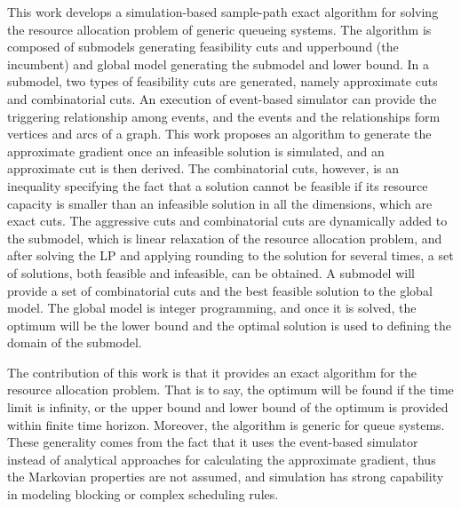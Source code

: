 \documentclass[]{interact}
\begin{document}
This work develops a simulation-based sample-path exact algorithm for solving the resource allocation problem of generic queueing systems. The algorithm is composed of submodels generating feasibility cuts and upperbound (the incumbent) and global model generating the submodel and lower bound. In a submodel, two types of feasibility cuts are generated, namely approximate cuts and combinatorial cuts. An execution of event-based simulator can provide the triggering relationship among events, and the events and the relationships form vertices and arcs of a graph. This work proposes an algorithm to generate the approximate gradient once an infeasible solution is simulated, and an approximate cut is then derived. The combinatorial cuts, however, is an inequality specifying the fact that a solution cannot be feasible if its resource capacity is smaller than an infeasible solution in all the dimensions, which are exact cuts. The aggressive cuts and combinatorial cuts are dynamically added to the submodel, which is linear relaxation of the resource allocation problem, and after solving the LP and applying rounding to the solution for several times, a set of solutions, both feasible and infeasible, can be obtained. A submodel will provide a set of combinatorial cuts and the best feasible solution to the global model. The global model is integer programming, and once it is solved, the optimum will be the lower bound and the optimal solution is used to defining the domain of the submodel.

The contribution of this work is that it provides an exact algorithm for the resource allocation problem. That is to say, the optimum will be found if the time limit is infinity, or the upper bound and lower bound of the optimum is provided within finite time horizon. Moreover, the algorithm is generic for queue systems. These generality comes from the fact that it uses the event-based simulator instead of analytical approaches for calculating the approximate gradient, thus the Markovian properties are not assumed, and simulation has strong capability in modeling blocking or complex scheduling rules.
\end{document}

